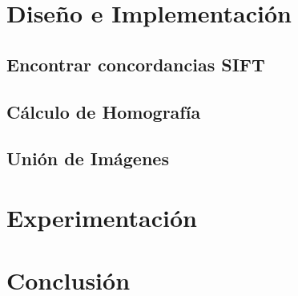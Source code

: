 \documentclass[conference]{IEEEtran}
\begin{document}
\section*{Diseño e Implementación}
	\subsection{Encontrar concordancias SIFT}

	\subsection{Cálculo de Homografía}
				
	\subsection{Unión de Imágenes}
	


\section*{Experimentación}

\section*{Conclusión}


\begin{thebibliography}{99}


\end{thebibliography}
\end{document}
